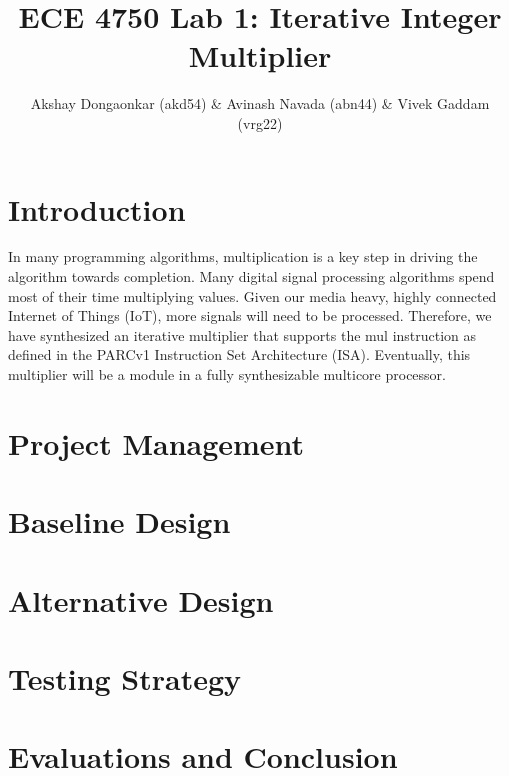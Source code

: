 \documentclass[11pt]{article}
\begin{document}
\title{ECE 4750 Lab 1: Iterative Integer Multiplier}
\author{Akshay Dongaonkar (akd54) \& Avinash Navada (abn44) \& Vivek Gaddam (vrg22)}
\maketitle

\section{Introduction}

In many programming algorithms, multiplication is a key step in driving the algorithm towards completion. 
Many digital signal processing algorithms spend most of their time multiplying values. Given our media heavy,
highly connected Internet of Things (IoT), more signals will need to be processed. Therefore, we have synthesized 
an iterative multiplier that supports the mul instruction as defined in the PARCv1 Instruction Set Architecture (ISA).
Eventually, this multiplier will be a module in a fully synthesizable multicore processor.




\section{Project Management}

\section{Baseline Design}

\section{Alternative Design}

\section{Testing Strategy}

\section{Evaluations and Conclusion}
\end{document}
